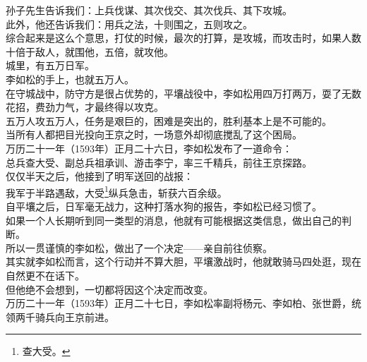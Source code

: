 \begin{multicols}{\theparacolNo}
孙子先生告诉我们：上兵伐谋、其次伐交、其次伐兵、其下攻城。\\

此外，他还告诉我们：用兵之法，十则围之，五则攻之。\\

综合起来是这么个意思，打仗的时候，最次的打算，是攻城，而攻击时，如果人数十倍于敌人，就围他，五倍，就攻他。\\

城里，有五万日军。\\

李如松的手上，也就五万人。\\

在守城战中，防守方是很占优势的，平壤战役中，李如松用四万打两万，耍了无数花招，费劲力气，才最终得以攻克。\\

五万人攻五万人，任务是艰巨的，困难是突出的，胜利基本上是不可能的。\\

当所有人都把目光投向王京之时，一场意外却彻底搅乱了这个困局。\\

万历二十一年（1593年）正月二十六日，李如松发布了一道命令：\\

总兵查大受、副总兵祖承训、游击李宁，率三千精兵，前往王京探路。\\

仅仅半天之后，他接到了明军送回的战报：\\

我军于半路遇敌，大受\footnote{查大受。}纵兵急击，斩获六百余级。\\

自平壤之后，日军毫无战力，这种打落水狗的报告，李如松已经习惯了。\\

如果一个人长期听到同一类型的消息，他就有可能根据这类信息，做出自己的判断。\\

所以一贯谨慎的李如松，做出了一个决定——亲自前往侦察。\\

其实就李如松而言，这个行动并不算大胆，平壤激战时，他就敢骑马四处逛，现在自然更不在话下。\\

但他绝不会想到，一切都将因这个决定而改变。\\

万历二十一年（1593年）正月二十七日，李如松率副将杨元、李如柏、张世爵，统领两千骑兵向王京前进。\\


\end{multicols}
